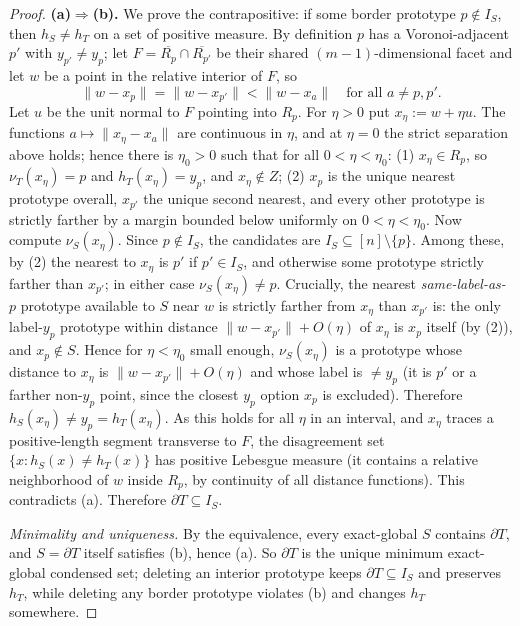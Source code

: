 \documentclass{amsart}
\theoremstyle{definition}
\begin{document}
\begin{proof}
\textbf{(a)$\Rightarrow$(b).} We prove the contrapositive: if some border
prototype $p\notin I_S$, then $h_S\ne h_T$ on a set of positive measure. By
definition $p$ has a Voronoi-adjacent $p'$ with $y_{p'}\ne y_p$; let
$F=\overline{R_p}\cap\overline{R_{p'}}$ be their shared $(m-1)$-dimensional
facet and let $w$ be a point in the relative interior of $F$, so
\[
\|w-x_p\|=\|w-x_{p'}\|<\|w-x_a\|\quad\text{for all }a\ne p,p' .
\]
Let $u$ be the unit normal to $F$ pointing into $R_p$. For $\eta>0$ put
$x_\eta:=w+\eta u$. The functions $a\mapsto\|x_\eta-x_a\|$ are continuous in
$\eta$, and at $\eta=0$ the strict separation above holds; hence there is
$\eta_0>0$ such that for all $0<\eta<\eta_0$:
(1) $x_\eta\in R_p$, so $\nu_T(x_\eta)=p$ and $h_T(x_\eta)=y_p$, and
$x_\eta\notin Z$;
(2) $x_p$ is the unique nearest prototype overall, $x_{p'}$ the unique second
nearest, and every other prototype is strictly farther by a margin bounded below
uniformly on $0<\eta<\eta_0$.
Now compute $\nu_S(x_\eta)$. Since $p\notin I_S$, the candidates are
$I_S\subseteq[n]\setminus\{p\}$. Among these, by (2) the nearest to $x_\eta$ is
$p'$ if $p'\in I_S$, and otherwise some prototype strictly farther than $x_{p'}$;
in either case $\nu_S(x_\eta)\ne p$. Crucially, the nearest \emph{same-label-as-}
$p$ prototype available to $S$ near $w$ is strictly farther from $x_\eta$ than
$x_{p'}$ is: the only label-$y_p$ prototype within distance $\|w-x_{p'}\|+
O(\eta)$ of $x_\eta$ is $x_p$ itself (by (2)), and $x_p\notin S$. Hence for
$\eta<\eta_0$ small enough, $\nu_S(x_\eta)$ is a prototype whose distance to
$x_\eta$ is $\|w-x_{p'}\|+O(\eta)$ and whose label is $\ne y_p$ (it is $p'$ or a
farther non-$y_p$ point, since the closest $y_p$ option $x_p$ is excluded).
Therefore $h_S(x_\eta)\ne y_p=h_T(x_\eta)$. As this holds for all $\eta$ in an
interval, and $x_\eta$ traces a positive-length segment transverse to $F$, the
disagreement set $\{x:h_S(x)\ne h_T(x)\}$ has positive Lebesgue measure (it
contains a relative neighborhood of $w$ inside $R_p$, by continuity of all
distance functions). This contradicts (a). Therefore $\partial T\subseteq I_S$.

\emph{Minimality and uniqueness.} By the equivalence, every exact-global $S$
contains $\partial T$, and $S=\partial T$ itself satisfies (b), hence (a). So
$\partial T$ is the unique minimum exact-global condensed set; deleting an
interior prototype keeps $\partial T\subseteq I_S$ and preserves $h_T$, while
deleting any border prototype violates (b) and changes $h_T$ somewhere.
\end{proof}
\end{document}
